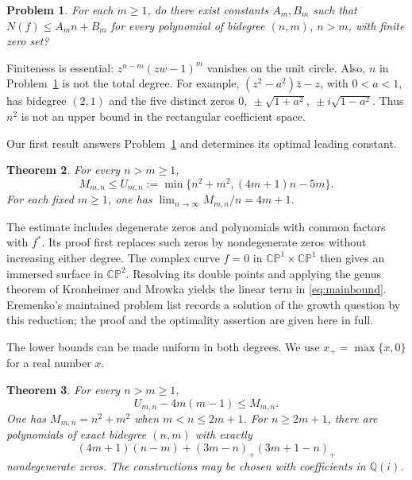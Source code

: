 \documentclass[a4paper]{amsart}
\newtheorem{thm}{Theorem}
\newtheorem{problem}[thm]{Problem}
\theoremstyle{remark}
\newcommand{\Q}{\mathbb Q}
\newcommand{\CP}{\mathbb {CP}}
\begin{document}
\begin{problem}\label{prob:linear}
For each \(m\ge1\), do there exist constants \(A_m,B_m\) such that
\(N(f)\le A_m n+B_m\) for every polynomial of bidegree \((n,m)\),
\(n>m\), with finite zero set?
\end{problem}

Finiteness is essential: \(z^{n-m}(zw-1)^m\) vanishes on the unit
circle. Also, \(n\) in Problem~\ref{prob:linear} is not the total
degree. For example, \((z^2-a^2)\bar z-z\), with \(0<a<1\), has
bidegree \((2,1)\) and the five distinct zeros
\(0,\ \pm\sqrt{1+a^2},\ \pm i\sqrt{1-a^2}\). Thus \(n^2\) is not an
upper bound in the rectangular coefficient space.

Our first result answers Problem~\ref{prob:linear} and determines its
optimal leading constant.

\begin{thm}\label{thm:linear}
For every \(n>m\ge1\),
\begin{equation}\label{eq:mainbound}
 M_{m,n}\le U_{m,n}:=\min\{n^2+m^2,(4m+1)n-5m\}.
\end{equation}
For each fixed \(m\ge1\), one has
\(\displaystyle\lim_{n\to\infty}M_{m,n}/n=4m+1\).
\end{thm}

The estimate includes degenerate zeros and polynomials with common
factors with \(f^*\). Its proof first replaces such zeros by
nondegenerate zeros without increasing either degree. The complex
curve \(f=0\) in \(\CP^1\times\CP^1\) then gives an immersed surface
in \(\CP^2\). Resolving its double points and applying the genus
theorem of Kronheimer and Mrowka \cite{KM94} yields the linear term
in \eqref{eq:mainbound}. Eremenko's maintained problem list
\cite{EreList} records a solution of the growth question by this
reduction; the proof and the optimality assertion are given here
in full.

The lower bounds can be made uniform in both degrees. We use
\(x_+=\max\{x,0\}\) for a real number \(x\).

\begin{thm}\label{thm:rectlower}
For every \(n>m\ge1\),
\begin{equation}\label{eq:uniform}
 U_{m,n}-4m(m-1)\le M_{m,n}.
\end{equation}
One has \(M_{m,n}=n^2+m^2\) when \(m<n\le2m+1\). For
\(n\ge2m+1\), there are polynomials of exact bidegree \((n,m)\)
with exactly
\begin{equation}\label{eq:lowercount}
 (4m+1)(n-m)+(3m-n)_+(3m+1-n)_+
\end{equation}
nondegenerate zeros. The constructions may be chosen with
coefficients in \(\Q(i)\).
\end{thm}
\end{document}
